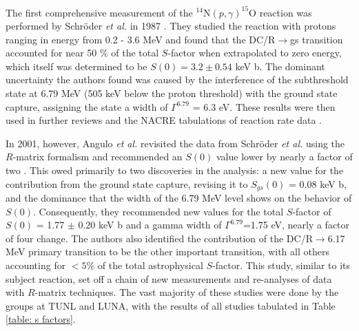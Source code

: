 The first comprehensive measurement of the $^{14}$N$\left( p,\gamma \right) ^{15}$O reaction was performed by Schr{\"o}der \textit{et al.} in 1987 \cite{Schroder1987}. They studied the reaction with protons ranging in energy from 0.2 - 3.6 MeV and found that the DC/R$\rightarrow$gs transition accounted for near 50 \% of the total $S$-factor when extrapolated to zero energy, which itself was determined to be $S(0) = 3.2 \pm 0.54$ keV b. The dominant uncertainty the authors found was caused by the interference of the subthreshold state at 6.79 MeV (505 keV below the proton threshold) with the ground state capture, assigning the state a width of $\Gamma^{6.79}$ = 6.3 eV. These results were then used in further reviews \cite{Adelberger1998} and the NACRE tabulations of reaction rate data \cite{Angulo1999}. 

In 2001, however, Angulo \textit{et al.} revisited the data from Schr{\"o}der \textit{et al.} \cite{Schroder1987} using the $R$-matrix formalism and recommended an $S(0)$ value lower by nearly a factor of two \cite{Angulo2001}. This owed primarily to two discoveries in the analysis: a new value for the contribution from the ground state capture, revising it to $S_{gs}(0)$ = 0.08 keV b, and the dominance that the width of the 6.79 MeV level shows on the behavior of $S(0)$. Consequently, they recommended new values for the total $S$-factor of $S(0)$ = 1.77 $\pm$ 0.20 keV b and a gamma width of $\Gamma^{6.79}$=1.75 eV, nearly a factor of four change. The authors also identified the contribution of the DC/R$\rightarrow$6.17 MeV primary transition to be the other important transition, with all others accounting for $< 5\%$ of the total astrophysical $S$-factor. This study, similar to its subject reaction, set off a chain of new measurements and re-analyses of data with $R$-matrix techniques. The vast majority of these studies were done by the groups at TUNL and LUNA, with the results of all studies tabulated in Table \ref{table: s factors}.

